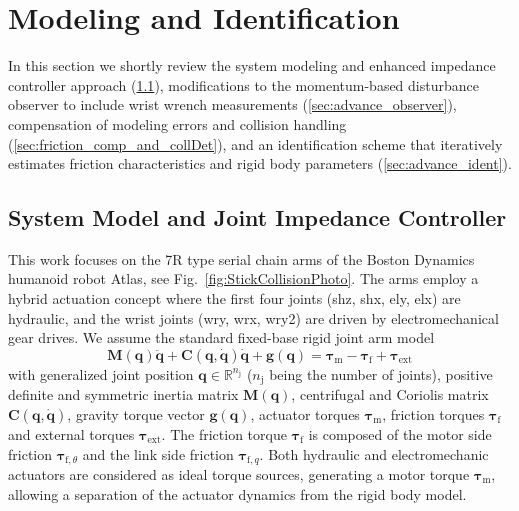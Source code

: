 \section{\large Modeling and Identification}
\label{sec:advance}

In this section we shortly review the system modeling and enhanced impedance controller approach (\ref{sec:advance_controller}), modifications to the momentum-based disturbance observer to include wrist wrench measurements (\ref{sec:advance_observer}), compensation of modeling errors and collision handling (\ref{sec:friction_comp_and_collDet}), and an identification scheme that iteratively estimates friction characteristics and rigid body parameters (\ref{sec:advance_ident}).

\subsection{System Model and Joint Impedance Controller}
\label{sec:advance_controller}
This work focuses on the 7R type serial chain arms of the Boston Dynamics humanoid robot Atlas, see Fig.~\ref{fig:StickCollisionPhoto}.
The arms employ a hybrid actuation concept where the first four joints (shz, shx, ely, elx) are hydraulic, and the wrist joints (wry, wrx, wry2) are driven by electromechanical gear drives.
We assume the standard fixed-base rigid joint arm model 
\begin{equation}
\bm{M(\bm{q})}\ddot{\bm{q}}+\bm{C}(\bm{q},\dot{\bm{q}})\dot{\bm{q}}+\bm{g}(\bm{q})=\bm{\tau}_\mathrm{m}-\bm{\tau}_\mathrm{f}+\bm{\tau}_\mathrm{ext}
\label{eqn:invdyn}
\end{equation}
with generalized joint position $\bm{q} \in \mathbb{R}^{n_\mathrm{j}}$ ($n_\mathrm{j}$ being the number of joints), positive definite and symmetric inertia matrix $\bm{M}(\bm{q})$, centrifugal and Coriolis matrix $\bm{C}(\bm{q}, \dot{\bm{q}})$, gravity torque vector $\bm{g}(\bm{q})$, actuator torques $\bm{\tau}_\mathrm{m}$, friction torques $\bm{\tau}_\mathrm{f}$ and external torques $\bm{\tau}_\mathrm{ext}$. 
The friction torque $\bm{\tau}_\mathrm{f}$ is composed of the motor side friction $\bm{\tau}_{\mathrm{f},\theta}$ and the link side friction $\bm{\tau}_{\mathrm{f},q}$.
Both hydraulic and electromechanic actuators are considered as ideal torque sources, generating a motor torque $\bm{\tau}_\mathrm{m}$, allowing a separation of the actuator dynamics from the rigid body model.

